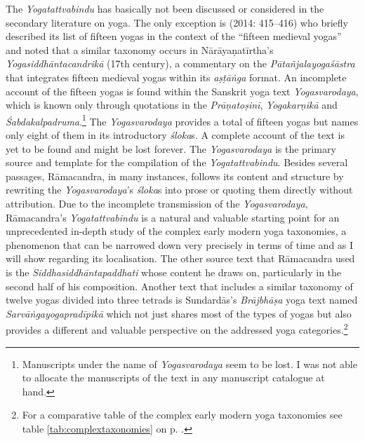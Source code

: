 The \textit{Yogatattvabindu} has basically not been discussed or considered in the secondary literature on yoga. The only exception is \citeauthor{birch2014} (2014: 415–416) who briefly described its list of fifteen yogas in the context of the ``fifteen medieval yogas'' and noted that a similar taxonomy occurs in Nārāyaṇatīrtha’s \textit{Yogasiddhāntacandrikā} (17th century), a commentary on the \textit{Pātañjalayogaśāstra} that integrates fifteen medieval yogas within its \textit{aṣṭāṅga} format. An incomplete account of the fifteen yogas is found within the Sanskrit yoga text \textit{Yogasvarodaya}, which is known only through quotations in the \textit{Prāṇatoṣinī}, \textit{Yogakarṇikā} and \emph{Śabdakalpadruma}.\footnote{Manuscripts under the name of \textit{Yogasvarodaya} seem to be lost. I was not able to allocate the manuscripts of the text in any manuscript catalogue at hand.} The \textit{Yogasvarodaya} provides a total of fifteen yogas but names only eight of them in its introductory \textit{śloka}s. A complete account of the text is yet to be found and might be lost forever. The \textit{Yogasvarodaya} is the primary source and template for the compilation of the \textit{Yogatattvabindu}. Besides several passages, Rāmacandra, in many instances, follows its content and structure by rewriting the \textit{Yogasvarodaya}’s \textit{śloka}s into prose or quoting them directly without attribution. Due to the incomplete transmission of the \textit{Yogasvarodaya}, Rāmacandra’s \textit{Yogatattvabindu} is a natural and valuable starting point for an unprecedented in-depth study of the complex early modern yoga taxonomies, a phenomenon that can be narrowed down very precisely in terms of time and as I will show regarding its localisation. The other source text that Rāmacandra used is the \textit{Siddhasiddhāntapaddhati} whose content he draws on, particularly in the second half of his composition. Another text that includes a similar taxonomy of twelve yogas divided into three tetrads is Sundardās’s \textit{Brājbhāṣa} yoga text named \textit{Sarvāṅgayogapradīpikā} which not just shares most of the types of yogas but also provides a different and valuable perspective on the addressed yoga categories.\footnote{For a comparative table of the complex early modern yoga taxonomies see table \ref{tab:complextaxonomies} on p. \pageref{tab:complextaxonomies}.}

